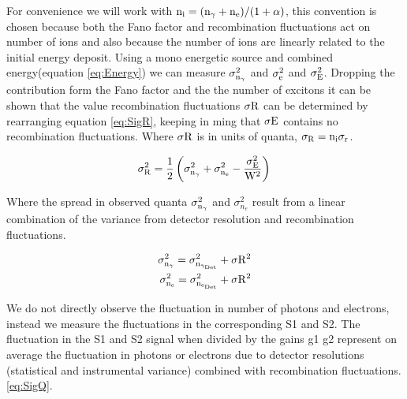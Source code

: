 For convenience we will work with $\rm n_i = (\rm n_\gamma + n_e)/(1+\alpha)$, this convention is chosen because both the Fano factor and recombination fluctuations act on number of ions and also because the number of ions are linearly related to the initial energy deposit. Using a mono energetic source and combined energy(equation \ref{eq:Energy}) we can measure $\rm \sigma_{n_\gamma}^2$ and $\rm \sigma_{e}^2$ and $\rm \sigma_{E}^2$. Dropping the contribution form the Fano factor and the the number of excitons it can be shown that the value recombination fluctuations $\rm \sigma R$ can be determined by rearranging equation \ref{eq:SigR}, keeping in ming that $\rm \sigma E$ contains no recombination fluctuations. Where $\rm \sigma R$ is in units of quanta, $\rm \sigma_R = n_i\sigma_r$.

\begin{equation}
\rm \sigma_{R}^2  = \frac{1}{2}\left(\sigma_{n_\gamma}^2 + \sigma_{n_e}^2 - \frac{\sigma_E^2}{W^2}\right)\\
\label{eq:Dahl}
\end{equation}

Where the spread in observed quanta $\rm \sigma_{n_\gamma}^2$ and $\sigma_{n_e}^2$ result from a linear combination of the variance from detector resolution and recombination fluctuations.

\begin{equation}
\begin{split}
\rm  \sigma_{n_{\gamma}}^2 = \sigma_{n_{\gamma_{Det}}}^2 + \sigma{R^2}\\
\rm \sigma_{n_{e}}^2 = \sigma_{n_{e_{Det}}}^2 + \sigma{R^2}
\label{eq:SigQ}
\end{split}
\end{equation}

We do not directly observe the fluctuation in number of photons and electrons, instead we measure the fluctuations in the corresponding S1 and S2. The fluctuation in the S1 and S2 signal when divided by the gains g1 g2 represent on average the fluctuation in photons or electrons due to detector resolutions (statistical and instrumental variance) combined with recombination fluctuations. \ref{eq:SigQ}.


